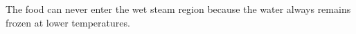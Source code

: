 The food can never enter the wet steam region because the water always remains frozen at lower temperatures.